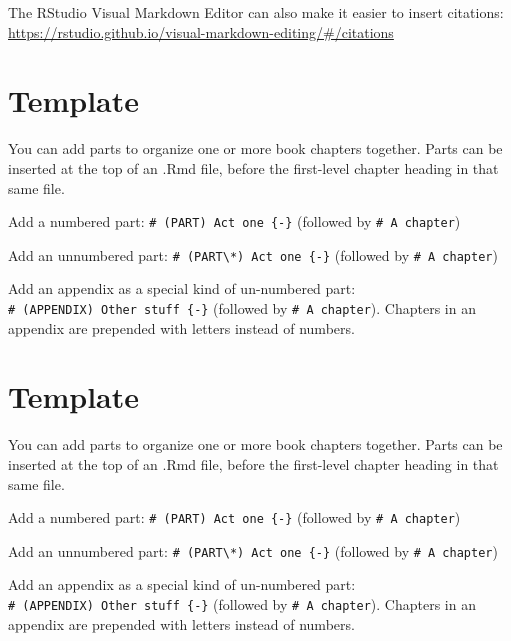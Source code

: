 \documentclass[
  oneside]{book}
\theoremstyle{definition}
\theoremstyle{definition}
\theoremstyle{definition}
\theoremstyle{definition}
\theoremstyle{remark}
\begin{document}
The RStudio Visual Markdown Editor can also make it easier to insert citations: \url{https://rstudio.github.io/visual-markdown-editing/\#/citations}

\hypertarget{template}{%
\chapter{Template}\label{template}}

You can add parts to organize one or more book chapters together. Parts can be inserted at the top of an .Rmd file, before the first-level chapter heading in that same file.

Add a numbered part: \texttt{\#\ (PART)\ Act\ one\ \{-\}} (followed by \texttt{\#\ A\ chapter})

Add an unnumbered part: \texttt{\#\ (PART\textbackslash{}*)\ Act\ one\ \{-\}} (followed by \texttt{\#\ A\ chapter})

Add an appendix as a special kind of un-numbered part: \texttt{\#\ (APPENDIX)\ Other\ stuff\ \{-\}} (followed by \texttt{\#\ A\ chapter}). Chapters in an appendix are prepended with letters instead of numbers.

\hypertarget{template-1}{%
\chapter{Template}\label{template-1}}

You can add parts to organize one or more book chapters together. Parts can be inserted at the top of an .Rmd file, before the first-level chapter heading in that same file.

Add a numbered part: \texttt{\#\ (PART)\ Act\ one\ \{-\}} (followed by \texttt{\#\ A\ chapter})

Add an unnumbered part: \texttt{\#\ (PART\textbackslash{}*)\ Act\ one\ \{-\}} (followed by \texttt{\#\ A\ chapter})

Add an appendix as a special kind of un-numbered part: \texttt{\#\ (APPENDIX)\ Other\ stuff\ \{-\}} (followed by \texttt{\#\ A\ chapter}). Chapters in an appendix are prepended with letters instead of numbers.

  
\end{document}
